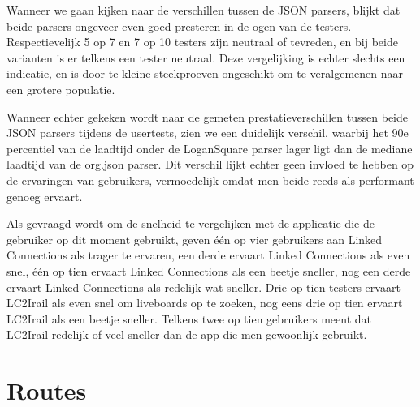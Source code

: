 Wanneer we gaan kijken naar de verschillen tussen de JSON parsers, blijkt dat beide parsers ongeveer even goed presteren in de ogen van de testers. Respectievelijk 5 op 7 en 7 op 10 testers zijn neutraal of tevreden, en bij beide varianten is er telkens een tester neutraal. Deze vergelijking is echter slechts een indicatie, en is door te kleine steekproeven ongeschikt om te veralgemenen naar een grotere populatie.

Wanneer echter gekeken wordt naar de gemeten prestatieverschillen tussen beide JSON parsers tijdens de usertests, zien we een duidelijk verschil, waarbij het 90e percentiel van de laadtijd onder de LoganSquare parser lager ligt dan de mediane laadtijd van de org.json parser. Dit verschil lijkt echter geen invloed te hebben op de ervaringen van gebruikers, vermoedelijk omdat men beide reeds als performant genoeg ervaart.

Als gevraagd wordt om de snelheid te vergelijken met de applicatie die de gebruiker op dit moment gebruikt, geven één op vier gebruikers aan Linked Connections als trager te ervaren, een derde ervaart Linked Connections als even snel, één op tien ervaart Linked Connections als een beetje sneller, nog een derde ervaart Linked Connections als redelijk wat sneller. Drie op tien testers ervaart LC2Irail als even snel om liveboards op te zoeken, nog eens drie op tien ervaart LC2Irail als een beetje sneller. Telkens twee op tien gebruikers meent dat LC2Irail redelijk of veel sneller dan de app die men gewoonlijk gebruikt.

\section{Routes}

